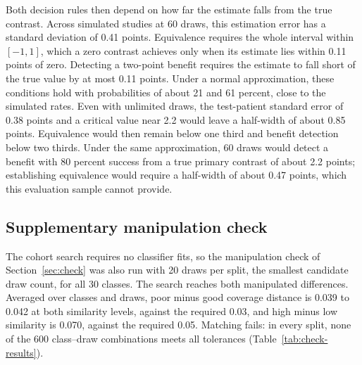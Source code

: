 Both decision rules then depend on how far the estimate falls from the true contrast. Across simulated studies at 60 draws, this estimation error has a standard deviation of 0.41 points. Equivalence requires the whole interval within $[-1,1]$, which a zero contrast achieves only when its estimate lies within 0.11 points of zero. Detecting a two-point benefit requires the estimate to fall short of the true value by at most 0.11 points. Under a normal approximation, these conditions hold with probabilities of about 21 and 61 percent, close to the simulated rates. Even with unlimited draws, the test-patient standard error of 0.38 points and a critical value near 2.2 would leave a half-width of about 0.85 points. Equivalence would then remain below one third and benefit detection below two thirds. Under the same approximation, 60 draws would detect a benefit with 80 percent success from a true primary contrast of about 2.2 points; establishing equivalence would require a half-width of about 0.47 points, which this evaluation sample cannot provide.

\subsection{Supplementary manipulation check}
\label{sec:check-results}
The cohort search requires no classifier fits, so the manipulation check of Section~\ref{sec:check} was also run with 20 draws per split, the smallest candidate draw count, for all 30 classes. The search reaches both manipulated differences. Averaged over classes and draws, poor minus good coverage distance is 0.039 to 0.042 at both similarity levels, against the required 0.03, and high minus low similarity is 0.070, against the required 0.05. Matching fails: in every split, none of the 600 class--draw combinations meets all tolerances (Table~\ref{tab:check-results}).

